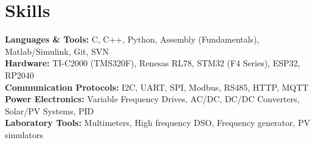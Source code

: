 \documentclass[letterpaper,11pt]{article}
\begin{document}
\vspace{-3pt}
\section{Skills}
\vspace{2pt}

  \textbf{Languages \& Tools:} {C, C++, Python, Assembly (Fundamentals), Matlab/Simulink, Git, SVN} \\ \vspace{2pt}
  \textbf{Hardware:} {TI-C2000 (TMS320F), Renesas RL78, STM32 (F4 Series), ESP32, RP2040} \\ \vspace{2pt}
  \textbf{Communication Protocols:} {I2C, UART, SPI, Modbus, RS485, HTTP, MQTT} \\ \vspace{2pt}
  \textbf{Power Electronics:} {Variable Frequency Drives, AC/DC, DC/DC Converters, Solar/PV Systems, PID} \\ \vspace{2pt}
  \textbf{Laboratory Tools:} {Multimeters, High frequency DSO, Frequency generator, PV simulators}

\vspace{-8pt}
\end{document}
